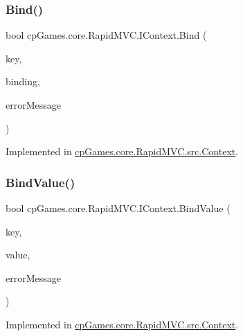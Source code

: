 \subsubsection{\texorpdfstring{Bind()}{Bind()}}
{\footnotesize\ttfamily bool cp\+Games.\+core.\+Rapid\+M\+V\+C.\+I\+Context.\+Bind (\begin{DoxyParamCaption}\item[{\mbox{\hyperlink{interfacecp_games_1_1core_1_1_rapid_m_v_c_1_1_i_binding_key}{I\+Binding\+Key}}}]{key,  }\item[{out \mbox{\hyperlink{interfacecp_games_1_1core_1_1_rapid_m_v_c_1_1_i_binding}{I\+Binding}}}]{binding,  }\item[{out string}]{error\+Message }\end{DoxyParamCaption})}



Implemented in \mbox{\hyperlink{classcp_games_1_1core_1_1_rapid_m_v_c_1_1src_1_1_context_a47ae1588b3891b1cd10bd102e2799465}{cp\+Games.\+core.\+Rapid\+M\+V\+C.\+src.\+Context}}.

\mbox{\label{interfacecp_games_1_1core_1_1_rapid_m_v_c_1_1_i_context_abd1373878fbfe20526c96a476e939e9e}} 
\subsubsection{\texorpdfstring{BindValue()}{BindValue()}}
{\footnotesize\ttfamily bool cp\+Games.\+core.\+Rapid\+M\+V\+C.\+I\+Context.\+Bind\+Value (\begin{DoxyParamCaption}\item[{\mbox{\hyperlink{interfacecp_games_1_1core_1_1_rapid_m_v_c_1_1_i_binding_key}{I\+Binding\+Key}}}]{key,  }\item[{object}]{value,  }\item[{out string}]{error\+Message }\end{DoxyParamCaption})}



Implemented in \mbox{\hyperlink{classcp_games_1_1core_1_1_rapid_m_v_c_1_1src_1_1_context_afc41dc6765626b99f60958bcbb31cf37}{cp\+Games.\+core.\+Rapid\+M\+V\+C.\+src.\+Context}}.

\mbox{\label{interfacecp_games_1_1core_1_1_rapid_m_v_c_1_1_i_context_acf8d52b810d6b088bf1999ea980c7705}} 
